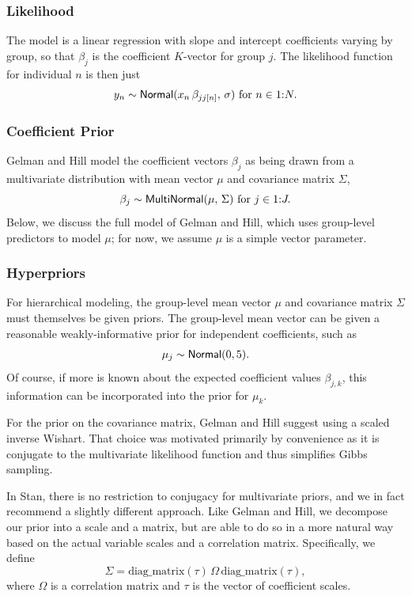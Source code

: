 \subsubsection{Likelihood}

The model is a linear regression with slope and intercept coefficients
varying by group, so that $\beta_j$ is the coefficient $K$-vector for
group $j$.  The likelihood function for individual $n$ is then just
%
\[
y_n \sim \distro{Normal}(x_n \, \beta_{jj[n]}, \, \sigma) 
\mbox{ for } n \in 1{:}N.
\]
%

\subsubsection{Coefficient Prior}

Gelman and Hill model the coefficient vectors $\beta_j$ as being drawn
from a multivariate distribution with mean vector $\mu$ and
covariance matrix $\Sigma$,%
%
\[
\beta_j \sim \distro{MultiNormal}(\mu, \, \Sigma)
\mbox{ for } j \in 1{:}J.
\]
%
Below, we discuss the full model of Gelman and Hill, which uses
group-level predictors to model $\mu$; for now, we assume $\mu$ is a
simple vector parameter.

\subsubsection{Hyperpriors}

For hierarchical modeling, the group-level mean vector $\mu$ and
covariance matrix $\Sigma$ must themselves be given priors.  The
group-level mean vector can be given a reasonable weakly-informative
prior for independent coefficients, such as
%
\[
\mu_j \sim \distro{Normal}(0,5).
\]
Of course, if more is known about the expected coefficient values
$\beta_{j,k}$, this information can be incorporated into the prior for
$\mu_k$.  

For the prior on the covariance matrix, Gelman and Hill suggest using
a scaled inverse Wishart.  That choice was motivated primarily by
convenience as it is conjugate to the multivariate likelihood function
and thus simplifies Gibbs sampling.  

In Stan, there is no restriction to conjugacy for multivariate priors,
and we in fact recommend a slightly different approach.  Like Gelman
and Hill, we decompose our prior into a scale and a matrix, but are
able to do so in a more natural way based on the actual variable
scales and a correlation matrix.  Specifically, we define 
\[
\Sigma = \mbox{diag\_matrix}(\tau) \, \Omega \, \mbox{diag\_matrix}(\tau),
\]
where $\Omega$ is a correlation matrix and $\tau$ is the vector of
coefficient scales.  

